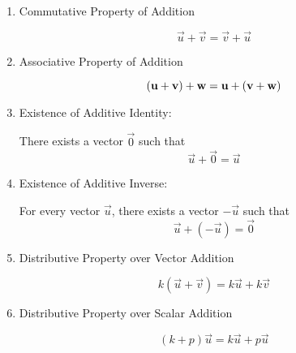 \documentclass{ximera}
\begin{document}
  \begin{enumerate}
  \item 
  Commutative Property of Addition
\begin{expandable}{}{}  
  $$\vec{u}+\vec{v}=\vec{v}+\vec{u}$$
\end{expandable}  

  \item 
  Associative Property of Addition
  \begin{expandable}{}{}
  $$(\vec{u}+\vec{v})+{\bf w}=\vec{u}+(\vec{v}+{\bf w})$$
   \end{expandable}

  \item 
  Existence of Additive Identity: 
  \begin{expandable}{}{}There exists a vector $\vec{0}$ such that
  $$\vec{u}+\vec{0}=\vec{u}$$
  \end{expandable}

  \item 
  Existence of Additive Inverse: 
  \begin{expandable}{}{}For every vector $\vec{u}$, there exists a vector $-\vec{u}$ such that
  $$\vec{u}+(-\vec{u})=\vec{0}$$
  \end{expandable}

  \item
  Distributive Property over Vector Addition
  \begin{expandable}{}{}
  $$k(\vec{u}+\vec{v})=k\vec{u}+k\vec{v}$$
  \end{expandable}

  \item
  Distributive Property over Scalar Addition
  \begin{expandable}{}{}
  $$(k+p)\vec{u}=k\vec{u}+p\vec{u}$$
  \end{expandable}


\end{enumerate}
\end{document}
